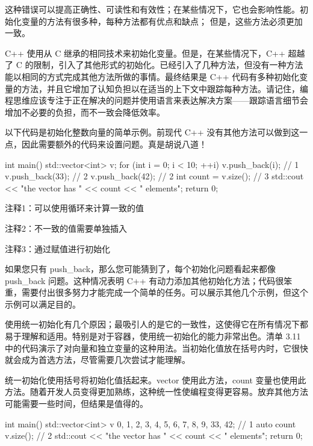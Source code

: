 这种错误可以提高正确性、可读性和有效性；在某些情况下，它也会影响性能。初始化变量的方法有很多种，每种方法都有优点和缺点； 但是，这些方法必须更加一致。


C++ 使用从 C 继承的相同技术来初始化变量。但是，在某些情况下，C++ 超越了 C 的限制，引入了其他形式的初始化。已经引入了几种方法，但没有一种方法能以相同的方式完成其他方法所做的事情。最终结果是 C++ 代码有多种初始化变量的方法，并且它增加了认知负担以在适当的上下文中跟踪每种方法。请记住，编程思维应该专注于正在解决的问题并使用语言来表达解决方案——跟踪语言细节会增加不必要的负担，而不一致会降低效率。

以下代码是初始化整数向量的简单示例。前现代 C++ 没有其他方法可以做到这一点，因此需要额外的代码来设置问题。真是胡说八道！


\begin{cpp}
int main() {
  std::vector<int> v;
  for (int i = 0; i < 10; ++i)
    v.push_back(i); // 1
  v.push_back(33); // 2
  v.push_back(42); // 2
  int count = v.size(); // 3
  std::cout << "the vector has " << count << " elements\n";
  return 0;
}
\end{cpp}

{\footnotesize
注释1：可以使用循环来计算一致的值

注释2：不一致的值需要单独插入

注释3：通过赋值进行初始化
}


如果您只有 push\_back，那么您可能猜到了，每个初始化问题看起来都像 push\_back 问题。这种情况表明 C++ 有动力添加其他初始化方法；代码很笨重，需要付出很多努力才能完成一个简单的任务。可以展示其他几个示例，但这个示例可以满足目的。


使用统一初始化有几个原因；最吸引人的是它的一致性，这使得它在所有情况下都易于理解和适用。特别是对于容器，使用统一初始化的能力非常出色。清单 3.11 中的代码演示了对向量和独立变量的这种用法。当初始化值放在括号内时，它很快就会成为首选方法，尽管需要几次尝试才能理解。

统一初始化使用括号将初始化值括起来。vector 使用此方法，count 变量也使用此方法。随着开发人员变得更加熟练，这种统一性使编程变得更容易。放弃其他方法可能需要一些时间，但结果是值得的。


\begin{cpp}
int main() {
  std::vector<int> v {0, 1, 2, 3, 4, 5, 6, 7, 8, 9, 33, 42}; // 1
  auto count {v.size()}; // 2
  std::cout << "the vector has " << count << " elements\n";
  return 0;
}
\end{cpp}

